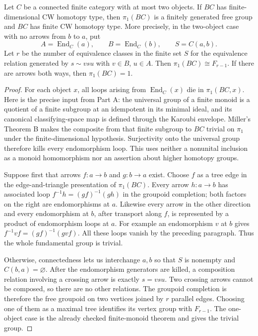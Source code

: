 \begin{theorem}
\label{D:two-objects}
Let $C$ be a connected finite category with at most two objects.
If $BC$ has finite-dimensional CW homotopy type, then $\pi_1(BC)$
is a finitely generated free group and $BC$ has finite CW homotopy
type.  More precisely, in the two-object case with no arrows from
$b$ to $a$, put
\[
 A=\operatorname{End}_C(a),\qquad
 B=\operatorname{End}_C(b),\qquad S=C(a,b).
\]
Let $r$ be the number of equivalence classes in the finite set $S$
for the equivalence relation generated by
$s\sim vsu$ with $v\in B$, $u\in A$.  Then
$\pi_1(BC)\cong F_{r-1}$.  If there are arrows both ways, then
$\pi_1(BC)=1$.
\end{theorem}
\begin{proof}
For each object $x$, all loops arising from
$\operatorname{End}_C(x)$ die in $\pi_1(BC,x)$.
Here is the precise input from Part A: the universal group of a finite
monoid is a quotient of a finite subgroup at an idempotent in its
minimal ideal, and its canonical classifying-space map is defined
through the Karoubi envelope.  Miller's Theorem B makes the composite
from that finite subgroup to $BC$ trivial on $\pi_1$ under the
finite-dimensional hypothesis.  Surjectivity onto the universal group
therefore kills every endomorphism loop.  This uses neither a
nonunital inclusion as a monoid homomorphism nor an assertion about
higher homotopy groups.

Suppose first that arrows $f:a\to b$ and $g:b\to a$ exist.
Choose $f$ as a tree edge in the edge-and-triangle presentation of
$\pi_1(BC)$.  Every arrow $h:a\to b$ has associated loop
$f^{-1}h=(gf)^{-1}(gh)$ in the groupoid completion; both factors on
the right are endomorphisms at $a$.  Likewise every arrow in the
other direction and every endomorphism at $b$, after transport along
$f$, is represented by a product of endomorphism loops at $a$.
For example an endomorphism $v$ at $b$ gives
$f^{-1}vf=(gf)^{-1}(gvf)$.  All these loops vanish by the preceding
paragraph.  Thus the whole fundamental group is trivial.

Otherwise, connectedness lets us interchange $a,b$ so that $S$ is
nonempty and $C(b,a)=\varnothing$.  After the endomorphism generators
are killed, a composition relation involving a crossing arrow is
exactly $s=vsu$.  Two crossing arrows cannot be composed, so there
are no other relations.  The groupoid completion is therefore the
free groupoid on two vertices joined by $r$ parallel edges.  Choosing
one of them as a maximal tree identifies its vertex group with
$F_{r-1}$.  The one-object case is the already checked finite-monoid
theorem and gives the trivial group.


\end{proof}
